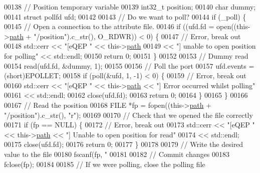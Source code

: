 \begin{DoxyCode}
{{{00138   \textcolor{comment}{// Position temporary variable}
00139   int32\_t position;
00140   \textcolor{keywordtype}{char} dummy;
00141   \textcolor{keyword}{struct }pollfd ufd;
00142 
00143   \textcolor{comment}{// Do we want to poll?}
00144   \textcolor{keywordflow}{if} (\_poll) \{
00145     \textcolor{comment}{// Open a connection to the attribute file.}
00146     \textcolor{keywordflow}{if} ((ufd.fd = open((this->\hyperlink{class_hardware_1_1e_q_e_p_a82718bc8478cde37f28fc685a859525e}{path} + \textcolor{stringliteral}{"/position"}).c\_str(), O\_RDWR)) < 0) \{
00147       \textcolor{comment}{// Error, break out}
00148       std::cerr << \textcolor{stringliteral}{"[eQEP "} << this->\hyperlink{class_hardware_1_1e_q_e_p_a82718bc8478cde37f28fc685a859525e}{path}
00149                 << \textcolor{stringliteral}{"] unable to open position for polling"} << std::endl;
00150       \textcolor{keywordflow}{return} 0;
00151     \}
00152 
00153     \textcolor{comment}{// Dummy read}
00154     read(ufd.fd, &dummy, 1);
00155 
00156     \textcolor{comment}{// Poll the port}
00157     ufd.events = (short)EPOLLET;
00158     \textcolor{keywordflow}{if} (poll(&ufd, 1, -1) < 0) \{
00159       \textcolor{comment}{// Error, break out}
00160       std::cerr << \textcolor{stringliteral}{"[eQEP "} << this->\hyperlink{class_hardware_1_1e_q_e_p_a82718bc8478cde37f28fc685a859525e}{path} << \textcolor{stringliteral}{"] Error occurred whilst polling"}
00161                 << std::endl;
00162       close(ufd.fd);
00163       \textcolor{keywordflow}{return} 0;
00164     \}
00165   \}
00166 
00167   \textcolor{comment}{// Read the position}
00168   FILE *fp = fopen((this->\hyperlink{class_hardware_1_1e_q_e_p_a82718bc8478cde37f28fc685a859525e}{path} + \textcolor{stringliteral}{"/position"}).c\_str(), \textcolor{stringliteral}{"r"});
00169 
00170   \textcolor{comment}{// Check that we opened the file correctly}
00171   \textcolor{keywordflow}{if} (fp == NULL) \{
00172     \textcolor{comment}{// Error, break out}
00173     std::cerr << \textcolor{stringliteral}{"[eQEP "} << this->\hyperlink{class_hardware_1_1e_q_e_p_a82718bc8478cde37f28fc685a859525e}{path} << \textcolor{stringliteral}{"] Unable to open position for read"}
00174               << std::endl;
00175     close(ufd.fd);
00176     \textcolor{keywordflow}{return} 0;
00177   \}
00178 
00179   \textcolor{comment}{// Write the desired value to the file}
00180   fscanf(fp, \textcolor{stringliteral}{"%
00181 
00182   \textcolor{comment}{// Commit changes}
00183   fclose(fp);
00184 
00185   \textcolor{comment}{// If we were polling, close the polling file}
}}}}
\end{DoxyCode}
